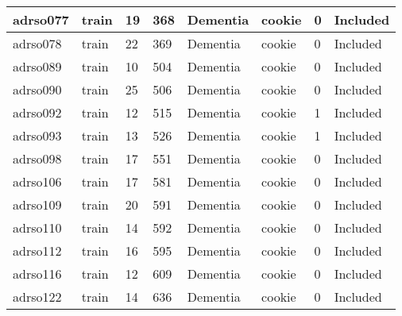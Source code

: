 \begin{center}
\begin{longtable}{|l|l|l|l|l|l|l|l|}
adrso077       & train                 & 19              & 368                & Dementia             & cookie          & 0                & Included      \\ \hline
adrso078       & train                 & 22              & 369                & Dementia             & cookie          & 0                & Included      \\ \hline
adrso089       & train                 & 10              & 504                & Dementia             & cookie          & 0                & Included      \\ \hline
adrso090       & train                 & 25              & 506                & Dementia             & cookie          & 0                & Included      \\ \hline
adrso092       & train                 & 12              & 515                & Dementia             & cookie          & 1                & Included      \\ \hline
adrso093       & train                 & 13              & 526                & Dementia             & cookie          & 1                & Included      \\ \hline
adrso098       & train                 & 17              & 551                & Dementia             & cookie          & 0                & Included      \\ \hline
adrso106       & train                 & 17              & 581                & Dementia             & cookie          & 0                & Included      \\ \hline
adrso109       & train                 & 20              & 591                & Dementia             & cookie          & 0                & Included      \\ \hline
adrso110       & train                 & 14              & 592                & Dementia             & cookie          & 0                & Included      \\ \hline
adrso112       & train                 & 16              & 595                & Dementia             & cookie          & 0                & Included      \\ \hline
adrso116       & train                 & 12              & 609                & Dementia             & cookie          & 0                & Included      \\ \hline
adrso122       & train                 & 14              & 636                & Dementia             & cookie          & 0                & Included      \\ \hline

\end{longtable}
\end{center}

